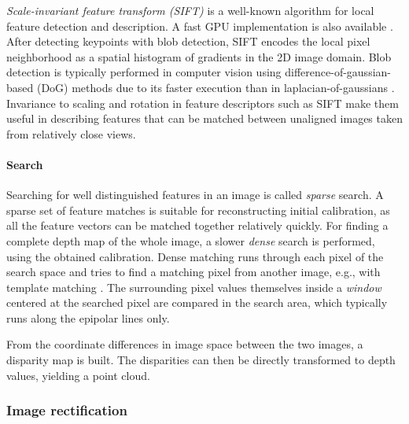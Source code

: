\emph{Scale-invariant feature transform (SIFT)} \cite{lowe1999object} is a well-known algorithm for local feature detection and description.
A fast GPU implementation is also available \cite{changchang2007siftgpu}.
After detecting keypoints with blob detection, SIFT encodes the local pixel neighborhood as a spatial histogram of gradients in the 2D image domain.
Blob detection is typically performed in computer vision using difference-of-gaussian-based (DoG) methods due to its faster execution than in laplacian-of-gaussians \cite[p. 152]{szeliski10vision}.
Invariance to scaling and rotation in feature descriptors such as SIFT make them useful in describing features that can be matched between unaligned images taken from relatively close views.

\paragraph{Search}
Searching for well distinguished features in an image is called \emph{sparse} search.
A sparse set of feature matches is suitable for reconstructing initial calibration, as all the feature vectors can be matched together relatively quickly.
For finding a complete depth map of the whole image, a slower \emph{dense} search is performed, using the obtained calibration.
Dense matching runs through each pixel of the search space and tries to find a matching pixel from another image, e.g., with template matching \cite{duda1973pattern}.
The surrounding pixel values themselves inside a \emph{window} centered at the searched pixel are compared in the search area, which typically runs along the epipolar lines only.

From the coordinate differences in image space between the two images, a disparity map is built.
The disparities can then be directly transformed to depth values, yielding a point cloud.


\subsubsection{Image rectification} %


